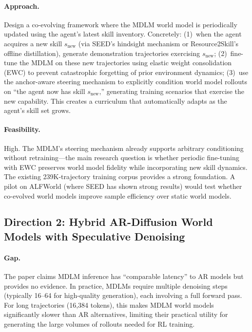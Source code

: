 \documentclass[11pt,a4paper]{article}
\begin{document}
\paragraph{Approach.}
Design a co-evolving framework where the MDLM world model is periodically updated using the agent's latest skill inventory. Concretely: (1)~when the agent acquires a new skill $s_{\text{new}}$ (via SEED's hindsight mechanism or Resource2Skill's offline distillation), generate demonstration trajectories exercising $s_{\text{new}}$; (2)~fine-tune the MDLM on these new trajectories using elastic weight consolidation (EWC) to prevent catastrophic forgetting of prior environment dynamics; (3)~use the anchor-aware steering mechanism to explicitly condition world model rollouts on ``the agent now has skill $s_{\text{new}}$,'' generating training scenarios that exercise the new capability. This creates a curriculum that automatically adapts as the agent's skill set grows.

\paragraph{Feasibility.}
High. The MDLM's steering mechanism already supports arbitrary conditioning without retraining---the main research question is whether periodic fine-tuning with EWC preserves world model fidelity while incorporating new skill dynamics. The existing 239K-trajectory training corpus provides a strong foundation. A pilot on ALFWorld (where SEED has shown strong results) would test whether co-evolved world models improve sample efficiency over static world models.

\subsection{Direction 2: Hybrid AR-Diffusion World Models with Speculative Denoising}

\paragraph{Gap.}
The paper claims MDLM inference has ``comparable latency'' to AR models but provides no evidence. In practice, MDLMs require multiple denoising steps (typically 16--64 for high-quality generation), each involving a full forward pass. For long trajectories (16,384 tokens), this makes MDLM world models significantly slower than AR alternatives, limiting their practical utility for generating the large volumes of rollouts needed for RL training.
\end{document}
